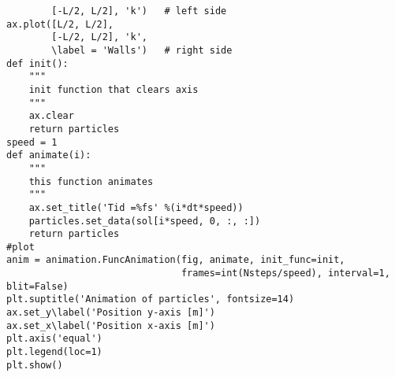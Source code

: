 \documentclass[%
oneside,                 %
final,                   %
10pt]{article}
\begin{document}
\begin{verbatim}
        [-L/2, L/2], 'k')   # left side
ax.plot([L/2, L/2],
        [-L/2, L/2], 'k',
        \label = 'Walls')   # right side
def init():
    """
    init function that clears axis
    """
    ax.clear
    return particles
speed = 1
def animate(i):
    """
    this function animates
    """
    ax.set_title('Tid =%fs' %(i*dt*speed))
    particles.set_data(sol[i*speed, 0, :, :])
    return particles
#plot
anim = animation.FuncAnimation(fig, animate, init_func=init,
                               frames=int(Nsteps/speed), interval=1, blit=False)
plt.suptitle('Animation of particles', fontsize=14)
ax.set_y\label('Position y-axis [m]')
ax.set_x\label('Position x-axis [m]')
plt.axis('equal')
plt.legend(loc=1)
plt.show()
\end{verbatim}


\end{document}
